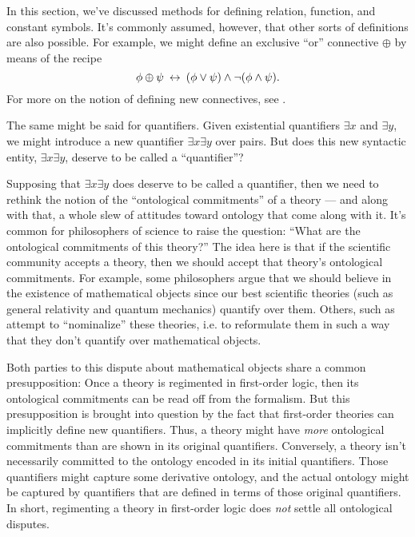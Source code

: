 \begin{disc} In this section, we've discussed methods for defining
  relation, function, and constant symbols.  It's commonly assumed,
  however, that other sorts of definitions are also possible.  For
  example, we might define an exclusive ``or'' connective $\oplus$ by
  means of the recipe
  \[ \phi\oplus\psi \: \leftrightarrow \: (\phi\vee\psi )\wedge \neg
    (\phi\wedge\psi ) .\] For more on the notion of defining new
  connectives, see \citep{dewar}.

  The same might be said for quantifiers.  Given existential
  quantifiers $\exists x$ and $\exists y$, we might introduce a new
  quantifier $\exists x\exists y$ over pairs.  But does this new
  syntactic entity, $\exists x\exists y$, deserve to be called a
  ``quantifier''?

  Supposing that $\exists x\exists y$ does deserve to be called a
  quantifier, then we need to rethink the notion of the ``ontological
  commitments'' of a theory --- and along with that, a whole slew of
  attitudes toward ontology that come along with it.  It's common for
  philosophers of science to raise the question: ``What are the
  ontological commitments of this theory?''  The idea here is that if
  the scientific community accepts a theory, then we should accept
  that theory's ontological commitments.  For example, some
  philosophers argue that we should believe in the existence of
  mathematical objects since our best scientific theories (such as
  general relativity and quantum mechanics) quantify over them.
  Others, such as \cite{field2016} attempt to ``nominalize'' these
  theories, i.e. to reformulate them in such a way that they don't
  quantify over mathematical objects.

  Both parties to this dispute about mathematical objects share a
  common presupposition: Once a theory is regimented in first-order
  logic, then its ontological commitments can be read off from the
  formalism.  But this presupposition is brought into question by the
  fact that first-order theories can implicitly define new
  quantifiers.  Thus, a theory might have \textit{more} ontological
  commitments than are shown in its original quantifiers.  Conversely,
  a theory isn't necessarily committed to the ontology encoded in its
  initial quantifiers.  Those quantifiers might capture some
  derivative ontology, and the actual ontology might be captured by
  quantifiers that are defined in terms of those original quantifiers.
  In short, regimenting a theory in first-order logic does
  \textit{not} settle all ontological disputes.  
\end{disc}





